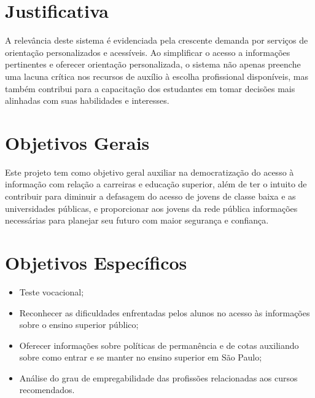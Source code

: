 

\section{Justificativa}

A relevância deste sistema é evidenciada pela crescente demanda por serviços de orientação personalizados e acessíveis. Ao simplificar o acesso a informações pertinentes e oferecer orientação personalizada, o sistema não apenas preenche uma lacuna crítica nos recursos de auxílio à escolha profissional disponíveis, mas também contribui para a capacitação dos estudantes em tomar decisões mais alinhadas com suas habilidades e interesses.

\section{Objetivos Gerais}

Este projeto tem como objetivo geral auxiliar na democratização do acesso à informação com relação a carreiras e educação superior, além de ter o intuito de contribuir para diminuir a defasagem do acesso de jovens de classe baixa e as universidades públicas, e proporcionar aos jovens da rede pública informações necessárias para planejar seu futuro com maior segurança e confiança.

\section{Objetivos Específicos}

\begin{itemize}
\item Teste vocacional;
\item Reconhecer as dificuldades enfrentadas pelos alunos no acesso às informações sobre o  ensino superior público;
\item Oferecer informações sobre políticas de permanência e de cotas auxiliando sobre como entrar e se manter no ensino superior em São Paulo;
\item Análise do grau de empregabilidade das profissões relacionadas aos cursos recomendados.
\end{itemize}
